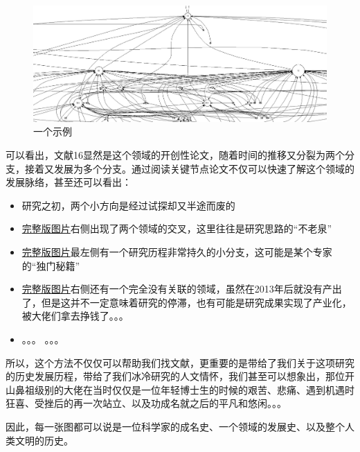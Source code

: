 \documentclass[UTF8]{ctexbook}
\begin{document}
\begin{figure}[!htb]
	\centering
	\includegraphics[width=1\linewidth]{Figure/typical_trace.JPG}
	\vspace{-0.3cm}
	\caption{一个示例}\label{fig:typical_trace}
\end{figure}

可以看出，文献16显然是这个领域的开创性论文，随着时间的推移又分裂为两个分支，接着又发展为多个分支。通过阅读关键节点论文不仅可以快速了解这个领域的发展脉络，甚至还可以看出：

\begin{itemize}
	\item 研究之初，两个小方向是经过试探却又半途而废的
	\item \href{https://raw.githubusercontent.com/lonelybag/Latex_lonelybag/V1.0/Script/002_NOTE_of_MASTER/Figure/typical_trace_full.jpg}{完整版图片}右侧出现了两个领域的交叉，这里往往是研究思路的“不老泉”
	\item \href{https://raw.githubusercontent.com/lonelybag/Latex_lonelybag/V1.0/Script/002_NOTE_of_MASTER/Figure/typical_trace_full.jpg}{完整版图片}最左侧有一个研究历程非常持久的小分支，这可能是某个专家的“独门秘籍”
	\item \href{https://raw.githubusercontent.com/lonelybag/Latex_lonelybag/V1.0/Script/002_NOTE_of_MASTER/Figure/typical_trace_full.jpg}{完整版图片}右侧还有一个完全没有关联的领域，虽然在2013年后就没有产出了，但是这并不一定意味着研究的停滞，也有可能是研究成果实现了产业化，被大佬们拿去挣钱了。。。
	\item 。。。 。。。
\end{itemize}

所以，这个方法不仅仅可以帮助我们找文献，更重要的是带给了我们关于这项研究的历史发展历程，带给了我们冰冷研究的人文情怀，我们甚至可以想象出，那位开山鼻祖级别的大佬在当时仅仅是一位年轻博士生的时候的艰苦、悲痛、遇到机遇时狂喜、受挫后的再一次站立、以及功成名就之后的平凡和悠闲。。。

因此，每一张图都可以说是一位科学家的成名史、一个领域的发展史、以及整个人类文明的历史。
\end{document}
